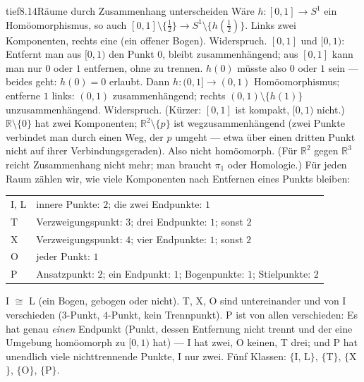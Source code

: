 \begin{loesungkarte}{tief}{8.14}{Räume durch Zusammenhang unterscheiden}
Wäre $h\colon[0, 1]\to S^{1}$ ein Homöomorphismus, so auch $[0, 1]\setminus\{\frac12\}\to S^{1}\setminus\{h(\frac12)\}$. Links zwei Komponenten, rechts eine (ein offener Bogen). Widerspruch. $[0, 1]$ und $[0, 1)$: Entfernt man aus $[0, 1)$ den Punkt $0$, bleibt zusammenhängend; aus $[0, 1]$ kann man nur $0$ oder $1$ entfernen, ohne zu trennen. $h(0)$ müsste also $0$ oder $1$ sein --- beides geht: $h(0) = 0$ erlaubt. Dann $h\colon(0, 1]\to(0, 1)$ Homöomorphismus; entferne $1$ links: $(0, 1)$ zusammenhängend; rechts $(0, 1)\setminus\{h(1)\}$ unzusammenhängend. Widerspruch. (Kürzer: $[0, 1]$ ist kompakt, $[0, 1)$ nicht.)
$\mathbb R\setminus\{0\}$ hat zwei Komponenten; $\mathbb R^{2}\setminus\{p\}$ ist wegzusammenhängend (zwei Punkte verbindet man durch einen Weg, der $p$ umgeht --- etwa über einen dritten Punkt nicht auf ihrer Verbindungsgeraden). Also nicht homöomorph. (Für $\mathbb R^{2}$ gegen $\mathbb R^{3}$ reicht Zusammenhang nicht mehr; man braucht $\pi_1$ oder Homologie.)
Für jeden Raum zählen wir, wie viele Komponenten nach Entfernen eines Punkts bleiben:
\begin{center}\small
\begin{tabular}{l|P{7.6cm}}
I, L & innere Punkte: $2$; die zwei Endpunkte: $1$\\
T & Verzweigungspunkt: $3$; drei Endpunkte: $1$; sonst $2$\\
X & Verzweigungspunkt: $4$; vier Endpunkte: $1$; sonst $2$\\
O & jeder Punkt: $1$\\
P & Ansatzpunkt: $2$; ein Endpunkt: $1$; Bogenpunkte: $1$; Stielpunkte: $2$
\end{tabular}
\end{center}
I $\cong$ L (ein Bogen, gebogen oder nicht). T, X, O sind untereinander und von I verschieden ($3$-Punkt, $4$-Punkt, kein Trennpunkt). P ist von allen verschieden: Es hat genau \emph{einen} Endpunkt (Punkt, dessen Entfernung nicht trennt und der eine Umgebung homöomorph zu $[0, 1)$ hat) --- I hat zwei, O keinen, T drei; und P hat unendlich viele nichttrennende Punkte, I nur zwei. Fünf Klassen: $\{$I, L$\}$, $\{$T$\}$, $\{$X$\}$, $\{$O$\}$, $\{$P$\}$.

\end{loesungkarte}
